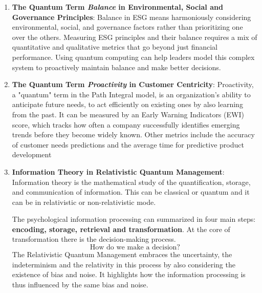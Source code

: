 \documentclass{article}
\begin{document}
\begin{enumerate}
    \item \textbf{The Quantum Term \textit{Balance} in Environmental, Social and Governance Principles}: Balance in ESG means harmoniously considering environmental, social, and governance factors rather than prioritizing one over the others. Measuring ESG principles and their balance requires a mix of quantitative and qualitative metrics that go beyond just financial performance. Using quantum computing can help leaders model this complex system to proactively maintain balance and make better decisions.
    \item \textbf{The Quantum Term \textit{Proactivity} in Customer Centricity}: Proactivity, a "quantum" term in the Path Integral model, is an organization's ability to anticipate future needs, to act efficiently on existing ones by also learning from the past. It can be measured by an Early Warning Indicators (EWI) score, which tracks how often a company successfully identifies emerging trends before they become widely known. Other metrics include the accuracy of customer needs predictions and the average time for predictive product development
    \item \textbf{Information Theory in Relativistic Quantum Management}: Information theory is the mathematical study of the quantification, storage, and communication of information. This can be classical or quantum and it can be in relativistic or non-relativistic mode.

    The psychological information processing can summarized in four main steps:
    \textbf{encoding, storage, retrieval and transformation}. At the core of transformation there is the decision-making process. 
    \begin{equation*}
        \text{How do we make a decision?}
    \end{equation*}
    The Relativistic Quantum Management embraces the uncertainty, the indeterminism and the relativity in this process by also considering the existence of bias and noise. It highlights how the information processing is thus influenced by the same bias and noise.

\end{enumerate}
\end{document}
